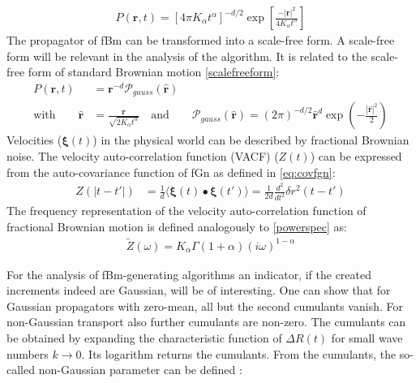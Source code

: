 \documentclass[
  a4paper,BCOR10mm,twoside,
  headsepline,footsepline,%
  fleqn,openbib
]{scrbook}
\begin{document}
\begin{align}
 P(\bm{r},t)=[4 \pi K_{\alpha} t^{\alpha}]^{-d/2} \exp \left[ \frac{-|\bm{r}|^2}{ 4 K_{\alpha} t^{\alpha} }\right]
\end{align}
The propagator of fBm can be transformed into a scale-free form. A scale-free form will be relevant in the analysis of the algorithm. It is related to the scale-free form of standard Brownian motion \cref{scalefreeform}:
\begin{align}
P(\bm{r},t)&= \bm{r}^{-d} \mathcal{P}_{gauss}(\hat{\bm{r}}) \\ \text{with} \qquad \hat{\bm{r}} &= \frac{\bm{r}}{\sqrt{2 K_{\alpha} t^{\alpha}}}  \quad \text{and} \qquad \mathcal{P}_{gauss}(\bm{\hat{r}})= (2 \pi)^{-d/2}  \bm{\hat{r}}^d \exp \left(- \frac{|\bm{\hat{r}}|^2}{2} \right)\label{scalefreeformfrac}
\end{align}
Velocities ($\bm{\xi}(t)$) in the physical world can be described by fractional Brownian noise. The velocity auto-correlation function (VACF) ($Z(t)$) can be expressed from the auto-covariance function of fGn as defined in \cref{eq:covfgn}:
\begin{align}
Z(|t-t'|)&= \frac{1}{d}\langle \bm{\xi}(t) \bullet \bm{\xi}(t') \rangle = \frac{1}{2d} \frac{d^2}{dt^2} \delta r^2 (t-t')  
\end{align}
The frequency representation of the velocity auto-correlation function of fractional Brownian motion is defined analogously to \cref{powerspec} as:
\begin{align}
  \tilde{Z}(\omega) =  K_{\alpha} \Gamma(1+\alpha)(i \omega)^{1-\alpha}
\end{align}

For the analysis of fBm-generating algorithms an indicator, if the created increments indeed are Gaussian, will be of interesting. One can show that for Gaussian propagators with zero-mean, all but the second cumulants vanish. For non-Gaussian transport also further cumulants are non-zero. The cumulants can be obtained by expanding the characteristic function of $\Delta R(t)$ for small wave numbers $k \rightarrow 0$. Its logarithm returns the cumulants. From the cumulants, the so-called non-Gaussian parameter can be defined \cite{Hofling2013}:
\end{document}
